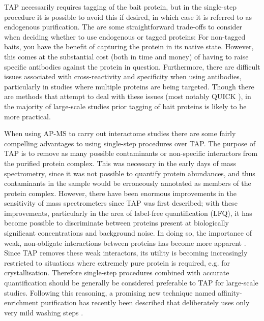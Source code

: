 \documentclass[a4paper,11pt,twoside,openright]{scrbook}
\begin{document}
TAP necessarily requires tagging of the bait protein, but in the single-step procedure it is possible to avoid this if desired, in which case it is referred to as endogenous purification. The are some straightforward trade-offs to consider when deciding whether to use endogenous or tagged proteins: For non-tagged baits, you have the benefit of capturing the protein in its native state. However, this comes at the substantial cost (both in time and money) of having to raise specific antibodies against the protein in question. Furthermore, there are difficult issues associated with cross-reactivity and specificity when using antibodies, particularly in studies where multiple proteins are being targeted. Though there are methods that attempt to deal with these issues (most notably QUICK \cite{Selbach2006}), in the majority of large-scale studies prior tagging of bait proteins is likely to be more practical.

When using AP-MS to carry out interactome studies there are some fairly compelling advantages to using single-step procedures over TAP. The purpose of TAP is to remove as many possible contaminants or non-specific interactors from the purified protein complex. This was necessary in the early days of mass spectrometry, since it was not possible to quantify protein abundances, and thus contaminants in the sample would be erroneously annotated as members of the protein complex. However, there have been enormous improvements in the sensitivity of mass spectrometers since TAP was first described; with these improvements, particularly in the area of label-free quantification (LFQ), it has become possible to discriminate between proteins present at biologically significant concentrations and background noise. In doing so, the importance of weak, non-obligate interactions between proteins has become more apparent \cite{Perkins2010a,Hein2015}. Since TAP removes these weak interactors, its utility is becoming increasingly restricted to situations where extremely pure protein is required, e.g. for crystallisation. Therefore single-step procedures combined with accurate quantification should be generally be considered preferable to TAP for large-scale studies. Following this reasoning, a promising new technique named affinity-enrichment purification has recently been described that deliberately uses only very mild washing steps \cite{Keilhauer2015}.
\end{document}

